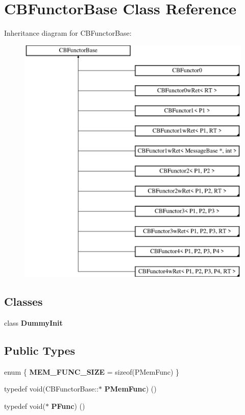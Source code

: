 \section{C\+B\+Functor\+Base Class Reference}
\label{classCBFunctorBase}
Inheritance diagram for C\+B\+Functor\+Base\+:\begin{figure}[H]
\begin{center}
\leavevmode
\includegraphics[height=12.000000cm]{classCBFunctorBase}
\end{center}
\end{figure}
\subsection*{Classes}
\begin{DoxyCompactItemize}
\item 
class {\bf Dummy\+Init}
\end{DoxyCompactItemize}
\subsection*{Public Types}
\begin{DoxyCompactItemize}
\item 
enum \{ {\bfseries M\+E\+M\+\_\+\+F\+U\+N\+C\+\_\+\+S\+I\+ZE} = sizeof(P\+Mem\+Func)
 \}\label{classCBFunctorBase_abd5a4f1e7a01526a7531a0a10baea05a}

\item 
typedef void(C\+B\+Functor\+Base\+::$\ast$ {\bfseries P\+Mem\+Func}) ()\label{classCBFunctorBase_a0b6994a0ae24a0179f34884c3b3b1f81}

\item 
typedef void($\ast$ {\bfseries P\+Func}) ()\label{classCBFunctorBase_a4f0b9826c15d940e073292ce7bfae312}

\end{DoxyCompactItemize}
